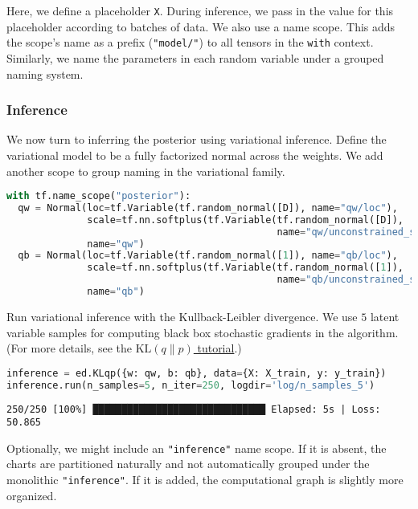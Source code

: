 Here, we define a placeholder \texttt{X}. During inference, we pass in
the value for this placeholder according to batches of data.  We also
use a name scope. This adds the scope's name as a prefix
(\texttt{"model/"}) to all tensors in the \texttt{with} context.
Similarly, we name the parameters in each random variable under a
grouped naming system.

\subsubsection{Inference}

We now turn to inferring the posterior using variational inference.
Define the variational model to be a fully factorized normal across
the weights. We add another scope to group naming in the variational
family.

\begin{lstlisting}[language=Python]
with tf.name_scope("posterior"):
  qw = Normal(loc=tf.Variable(tf.random_normal([D]), name="qw/loc"),
              scale=tf.nn.softplus(tf.Variable(tf.random_normal([D]),
                                               name="qw/unconstrained_scale")),
              name="qw")
  qb = Normal(loc=tf.Variable(tf.random_normal([1]), name="qb/loc"),
              scale=tf.nn.softplus(tf.Variable(tf.random_normal([1]),
                                               name="qb/unconstrained_scale")),
              name="qb")
\end{lstlisting}

Run variational inference with the Kullback-Leibler divergence.
We use $5$ latent variable samples for computing
black box stochastic gradients in the algorithm.
(For more details, see the
\href{/tutorials/klqp}{$\text{KL}(q\|p)$ tutorial}.)

\begin{lstlisting}[language=Python]
inference = ed.KLqp({w: qw, b: qb}, data={X: X_train, y: y_train})
inference.run(n_samples=5, n_iter=250, logdir='log/n_samples_5')
\end{lstlisting}

\begin{lstlisting}
250/250 [100%] ██████████████████████████████ Elapsed: 5s | Loss: 50.865
\end{lstlisting}

Optionally, we might include an \texttt{"inference"} name scope.
If it is absent, the charts are partitioned naturally
and not automatically grouped under the monolithic \texttt{"inference"}.
If it is added, the computational graph is slightly more organized.

